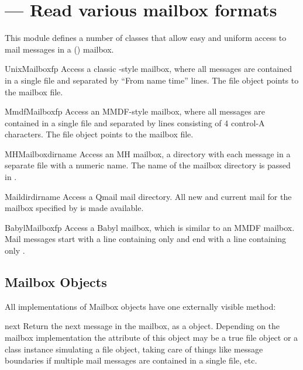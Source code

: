 \section{ ---
         Read various mailbox formats}



This module defines a number of classes that allow easy and uniform
access to mail messages in a (\UNIX{}) mailbox.

\begin{classdesc}{UnixMailbox}{fp}
Access a classic \UNIX{}-style mailbox, where all messages are contained
in a single file and separated by ``From name time'' lines.
The file object  points to the mailbox file.
\end{classdesc}

\begin{classdesc}{MmdfMailbox}{fp}
Access an MMDF-style mailbox, where all messages are contained
in a single file and separated by lines consisting of 4 control-A
characters.  The file object  points to the mailbox file.
\end{classdesc}

\begin{classdesc}{MHMailbox}{dirname}
Access an MH mailbox, a directory with each message in a separate
file with a numeric name.
The name of the mailbox directory is passed in .
\end{classdesc}

\begin{classdesc}{Maildir}{dirname}
Access a Qmail mail directory.  All new and current mail for the
mailbox specified by  is made available.
\end{classdesc}

\begin{classdesc}{BabylMailbox}{fp}
Access a Babyl mailbox, which is similar to an MMDF mailbox.  Mail
messages start with a line containing only  and
end with a line containing only .
\end{classdesc}


\subsection{Mailbox Objects \label{mailbox-objects}}

All implementations of Mailbox objects have one externally visible
method:

\begin{methoddesc}[mailbox]{next}{}
Return the next message in the mailbox, as a  object.
Depending on the mailbox implementation the  attribute of this
object may be a true file object or a class instance simulating a file object,
taking care of things like message boundaries if multiple mail messages are
contained in a single file, etc.
\end{methoddesc}

